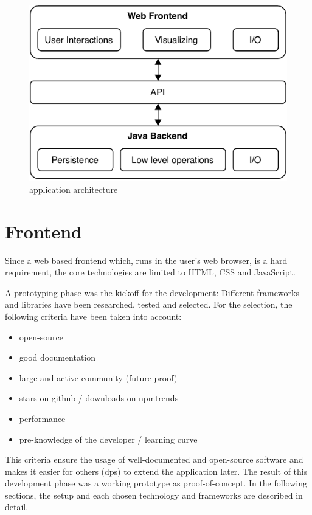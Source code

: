 \documentclass[a4paper,11pt,pdftex,halfparskip,cleardoubleempty,bibtotoc,liststotoc]{scrbook}
\begin{document}
\begin{figure}[h]
  \centering
  \vspace{0.8cm}
  \includegraphics[scale=0.8]{architecture}
  \caption{application architecture}
\end{figure}

\section{Frontend}
Since a web based frontend which, runs in the user's web browser, is a hard requirement, the core technologies are limited to HTML, CSS and JavaScript.
\par
A prototyping phase was the kickoff for the development: Different frameworks and libraries have been researched, tested and selected. For the selection, the following criteria have been taken into account:
\begin{itemize}
	\item open-source
	\item good documentation
	\item large and active community (future-proof)
	\item stars on github / downloads on npmtrends
	\item performance
	\item pre-knowledge of the developer / learning curve
\end{itemize}
This criteria ensure the usage of well-documented and open-source software and makes it easier for others (dps) to extend the application later.
The result of this development phase was a working prototype as proof-of-concept.
In the following sections, the setup and each chosen technology and frameworks are described in detail.
\end{document}
